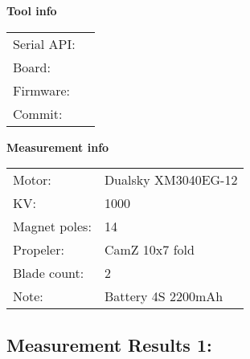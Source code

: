 \documentclass[10pt]{article}
\begin{document}
\noindent
{\large \bf Tool info}
\vspace{3mm}

\noindent
\begin{tabular}{ll}
Serial API:  & \\ 
Board:       & \\ 
Firmware:    & \\ 
Commit:      & 
\end{tabular}
\vspace{3mm}

\noindent
{\large \bf Measurement info}
\vspace{3mm}

\noindent
\begin{tabular}{ll}
Motor:        & Dualsky XM3040EG-12\\ 
KV:           & 1000\\ 
Magnet poles: & 14\\ 
Propeler:     & CamZ 10x7 fold\\ 
Blade count:  & 2\\ 
Note:         & Battery 4S 2200mAh
\end{tabular}

\vspace{3mm}


\subsection*{\large \bf Measurement Results 1:}
\end{document}
